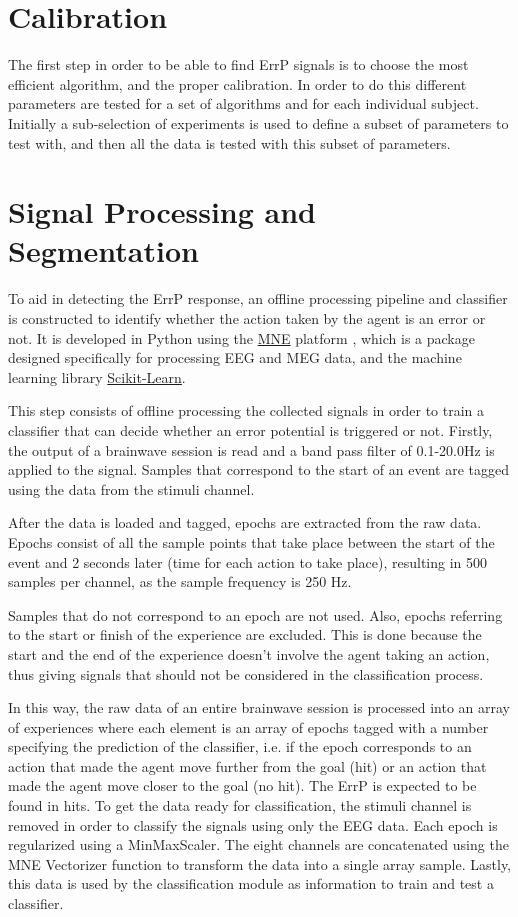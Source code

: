 \documentclass[journal]{IEEEtran}
\begin{document}
\section{Calibration}
\label{section:calibration}

The first step in order to be able to find ErrP signals is to choose the most efficient algorithm, and the proper calibration. In order to do this different parameters are tested for a set of algorithms and for each individual subject. Initially a sub-selection of experiments is used to define a subset of parameters to test with, and then all the data is tested with this subset of parameters.

\section{Signal Processing and Segmentation}

To aid in detecting the ErrP response, an offline processing pipeline and classifier is constructed to identify whether the action taken by the agent is an error or not. It is developed in Python using the \href{https://mne-tools.github.io/0.11/index.html}{MNE} platform \cite{MNE-PYTHON}, which is a package designed specifically for processing EEG and MEG data, and the machine learning library \href{https://scikit-learn.org/stable/}{Scikit-Learn}.

This step consists of offline processing the collected signals in order to train a classifier that can decide whether an error potential is triggered or not. Firstly, the output of a brainwave session is read and a band pass filter of 0.1-20.0Hz is applied to the signal. Samples that correspond to the start of an event are tagged using the data from the stimuli channel.

After the data is loaded and tagged, epochs are extracted from the raw data. Epochs consist of all the sample points that take place between the start of the event and 2 seconds later (time for each action to take place), resulting in 500 samples per channel, as the sample frequency is 250 Hz.

Samples that do not correspond to an epoch are not used. Also, epochs referring to the start or finish of the experience are excluded. This is done because the start and the end of the experience doesn't involve the agent taking an action, thus giving signals that should not be considered in the classification process.

In this way, the raw data of an entire brainwave session is processed into an array of experiences where each element is an array of epochs tagged with a number specifying the prediction of the classifier, i.e. if the epoch corresponds to an action that made the agent move further from the goal (hit) or an action that made the agent move closer to the goal (no hit). The ErrP is expected to be found in hits. To get the data ready for classification, the stimuli channel is removed in order to classify the signals using only the EEG data. Each epoch is regularized using a MinMaxScaler.  The eight channels are concatenated using the  MNE Vectorizer function to transform the data into a single array sample. Lastly, this data is used by the classification module as information to train and test a classifier.
\end{document}
